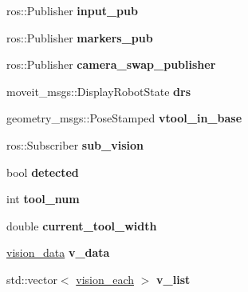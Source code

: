 \begin{DoxyCompactItemize}
\mbox{\label{structManipulate_a308351cbc3a07d57ebb531d4c5776208}} 
ros\+::\+Publisher {\bfseries input\+\_\+pub}
\item 
\mbox{\label{structManipulate_aae5e35c51039a307c6e1c9d827cc46c9}} 
ros\+::\+Publisher {\bfseries markers\+\_\+pub}
\item 
\mbox{\label{structManipulate_a6af1e61c477bd035ddcd83ce2629a719}} 
ros\+::\+Publisher {\bfseries camera\+\_\+swap\+\_\+publisher}
\item 
\mbox{\label{structManipulate_a8355b90632345303bb9251ab7ed72235}} 
moveit\+\_\+msgs\+::\+Display\+Robot\+State {\bfseries drs}
\item 
\mbox{\label{structManipulate_a5706416c6e3879326ccef47bce985700}} 
geometry\+\_\+msgs\+::\+Pose\+Stamped {\bfseries vtool\+\_\+in\+\_\+base}
\item 
\mbox{\label{structManipulate_a47f2a5460b2439a2046fb5bc3b703bb4}} 
ros\+::\+Subscriber {\bfseries sub\+\_\+vision}
\item 
\mbox{\label{structManipulate_a0e02c2c19cf1b57b76bcb51ae1989efc}} 
bool {\bfseries detected}
\item 
\mbox{\label{structManipulate_aae71558e0838e72eaf228b1f2b3382f5}} 
int {\bfseries tool\+\_\+num}
\item 
\mbox{\label{structManipulate_ab7885d696e4673dad3b29703ce235ec8}} 
double {\bfseries current\+\_\+tool\+\_\+width}
\item 
\mbox{\label{structManipulate_af09a63bccce38f437e3a317a9e3440b1}} 
\hyperlink{structvision__data}{vision\+\_\+data} {\bfseries v\+\_\+data}
\item 
\mbox{\label{structManipulate_a6c2574c82e8735618e41a468ae5d79b9}} 
std\+::vector$<$ \hyperlink{structvision__each}{vision\+\_\+each} $>$ {\bfseries v\+\_\+list}
\item 
\mbox{\label{structManipulate_ae973abe847026f8477840c51b2a24cae}} 

\end{DoxyCompactItemize}
